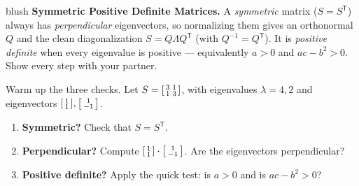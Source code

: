 \documentclass[10pt]{article}
\newcommand{\T}{\mathsf{T}}
\begin{document}
\namepartnerperiod

\vspace{0.10in}

\begin{headlinebox}{blush}
\small\textbf{Symmetric Positive Definite Matrices.} A \emph{symmetric} matrix ($S=S^{\T}$) always has
\emph{perpendicular} eigenvectors, so normalizing them gives an orthonormal $Q$ and the clean
diagonalization $S=Q\Lambda Q^{\T}$ (with $Q^{-1}=Q^{\T}$). It is \emph{positive definite} when every
eigenvalue is positive --- equivalently $a>0$ and $ac-b^2>0$. Show every step with your partner.
\end{headlinebox}

\vspace{0.08in}

\begin{tcolorbox}[colback=white, colframe=black!40, title=\textbf{Tier R --- Remediate},
    fonttitle=\bfseries, arc=1.5mm, left=3mm, right=3mm, top=2mm, bottom=2mm, breakable]
Warm up the three checks. Let $S=\begin{bsmallmatrix} 3 & 1\\ 1 & 3 \end{bsmallmatrix}$, with eigenvalues
$\lambda=4,2$ and eigenvectors $\begin{bsmallmatrix}1\\1\end{bsmallmatrix},\begin{bsmallmatrix}1\\-1\end{bsmallmatrix}$.
\begin{enumerate}[leftmargin=1.7em, itemsep=9pt]
  \item \textbf{Symmetric?} Check that $S=S^{\T}$. \writeline
  \item \textbf{Perpendicular?} Compute $\begin{bsmallmatrix}1\\1\end{bsmallmatrix}\cdot\begin{bsmallmatrix}1\\-1\end{bsmallmatrix}$. Are the eigenvectors perpendicular? \writeline
  \item \textbf{Positive definite?} Apply the quick test: is $a>0$ and is $ac-b^2>0$? \writeline
\end{enumerate}
\end{tcolorbox}
\end{document}
